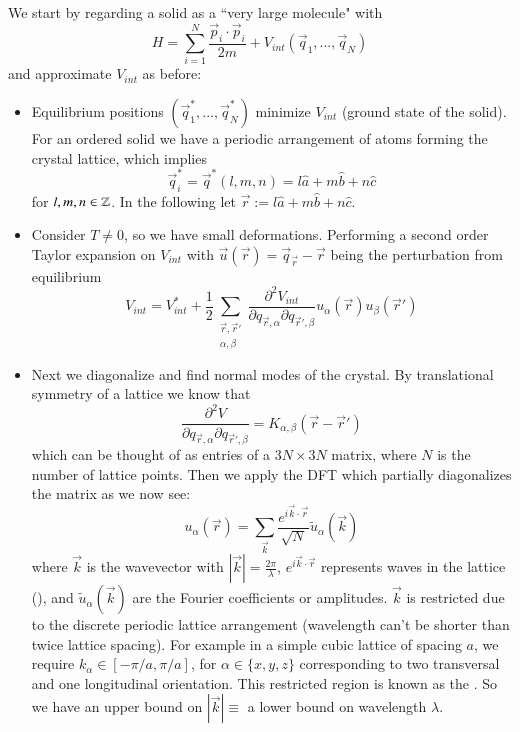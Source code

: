 \documentclass[12pt, a4paper, oneside, openright, titlepage]{book}
\begin{document}
We start by regarding a solid as a ``very large molecule" with $$H = \sum_{i=1}^N\frac{\vec{p}_i\cdot\vec{p}_i}{2m} + V_{int}(\vec{q}_1,...,\vec{q}_N)$$
and approximate $V_{int}$ as before: \begin{itemize}
    \item Equilibrium positions $(\vec{q}_1^*,...,\vec{q}_N^*)$ minimize $V_{int}$ (ground state of the solid). For an ordered solid we have a periodic arrangement of atoms forming the crystal lattice, which implies $$\vec{q}_i^* = \vec{q}^*(l,m,n) = l\hat{a}+m\hat{b}+n\hat{c}$$ for $l,m,n \in \mathbb Z$. In the following let $\vec{r} := l\hat{a}+m\hat{b}+n\hat{c}$.
    \item Consider $T \neq 0$, so we have small deformations. Performing a second order Taylor expansion on $V_{int}$ with $\vec{u}(\vec{r}) = \vec{q}_{\vec{r}} - \vec{r}$ being the perturbation from equilibrium \begin{equation*}
            V_{int} = V_{int}^* + \frac{1}{2} \sum_{\begin{array}{c}\vec{r},\vec{r}' \\ \alpha,\beta\end{array}}\frac{\partial^2V_{int}}{\partial q_{\vec{r},\alpha}\partial q_{\vec{r}',\beta}}u_{\alpha}(\vec{r})u_{\beta}(\vec{r}')
    \end{equation*}
    \item Next we diagonalize and find normal modes of the crystal. By translational symmetry of a lattice we know that \begin{equation*}
        \frac{\partial^2V}{\partial q_{\vec{r},\alpha}\partial q_{\vec{r}',\beta}} = K_{\alpha,\beta}(\vec{r}-\vec{r}')
    \end{equation*}
        which can be thought of as entries of a $3N\times 3N$ matrix, where $N$ is the number of lattice points. Then we apply the DFT which partially diagonalizes the matrix as we now see: \begin{equation*}
            u_{\alpha}(\vec{r}) = \sum_{\vec{k}} \frac{e^{i\vec{k}\cdot\vec{r}}}{\sqrt{N}}\tilde{u}_{\alpha}(\vec{k})
        \end{equation*}
        where $\vec{k}$ is the wavevector with $|\vec{k}| = \frac{2\pi}{\lambda}$, $e^{i\vec{k}\cdot\vec{r}}$ represents waves in the lattice (), and $\tilde{u}_{\alpha}(\vec{k})$ are the Fourier coefficients or amplitudes. $\vec{k}$ is restricted due to the discrete periodic lattice arrangement (wavelength can't be shorter than twice lattice spacing). For example in a simple cubic lattice of spacing $a$, we require $k_{\alpha} \in [-\pi/a,\pi/a]$, for $\alpha \in \{x,y,z\}$ corresponding to two transversal and one longitudinal orientation. This restricted region is known as the . So we have an upper bound on $|\vec{k}| \equiv$ a lower bound on wavelength $\lambda$.
\end{itemize}
\end{document}
